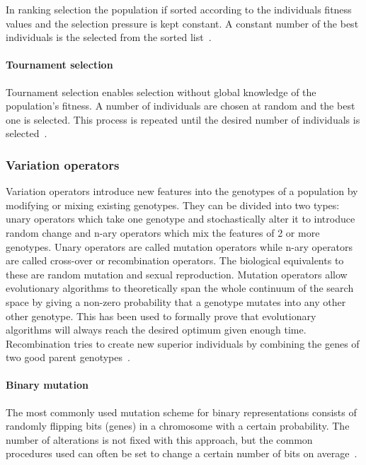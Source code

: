 In ranking selection the population if sorted according to the individuals fitness values and the selection pressure is kept constant. A constant number of the best individuals is the selected from the sorted list~\cite{Eiben2015asdfasd}.

\paragraph{Tournament selection}

Tournament selection enables selection without global knowledge of the population's fitness. A number of individuals are chosen at random and the best one is selected. This process is repeated until the desired number of individuals is selected~\cite{Eiben2015asdfasd}.


\subsubsection{Variation operators}

Variation operators introduce new features into the genotypes of a population by modifying or mixing existing genotypes. They can be divided into two types: unary operators which take one genotype and stochastically alter it to introduce random change and n-ary operators which mix the features of 2 or more genotypes. Unary operators are called mutation operators while n-ary operators are called cross-over or recombination operators. The biological equivalents to these are random mutation and sexual reproduction. Mutation operators allow evolutionary algorithms to theoretically span the whole continuum of the search space by giving a non-zero probability that a genotype mutates into any other other genotype. This has been used to formally prove that evolutionary algorithms will always reach the desired optimum given enough time. Recombination tries to create new superior individuals by combining the genes of two good parent genotypes~\cite{Eiben2015_whatevolutionary, Eiben20021}.

\paragraph{Binary mutation}

The most commonly used mutation scheme for binary representations consists of randomly flipping bits (genes) in a chromosome with a certain probability. The number of alterations is not fixed with this approach, but the common procedures used can often be set to change a certain number of bits on average~\cite{Eiben201511}.

